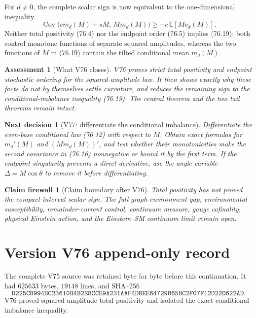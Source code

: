 \documentclass[11pt]{article}
\newtheorem{firewall}[theorem]{Claim firewall}
\newtheorem{decision}[theorem]{Next decision}
\newtheorem{assessment}[theorem]{Assessment}
\theoremstyle{remark}
\begin{document}
For \(d\neq0\), the complete scalar sign is now equivalent to the
one-dimensional inequality
\[
\boxed{
 \operatorname{Cov}
 \bigl(cm_d(M)+sM,\,Mm_d(M)\bigr)
 \geq-c\,\mathbb E[Mv_d(M)].}                    \tag{76.19}
\]
Neither total positivity (76.4) nor the endpoint order (76.5) implies
(76.19): both control monotone functions of separate squared
amplitudes, whereas the two functions of \(M\) in (76.19) contain the
tilted conditional mean \(m_d(M)\).

\begin{assessment}[What V76 closes]
\label{ass:v17v76-status}
V76 proves strict total positivity and endpoint stochastic ordering
for the squared-amplitude law.  It then shows exactly why these facts
do not by themselves settle curvature, and reduces the remaining sign
to the conditional-imbalance inequality (76.19).  The central theorem
and the two tail theorems remain intact.
\end{assessment}

\begin{decision}[V77: differentiate the conditional imbalance]
\label{dec:v17v76-next}
Differentiate the even-base conditional law (76.12) with respect to
\(M\).  Obtain exact formulas for \(m_d'(M)\) and
\((Mm_d(M))'\), and test whether their monotonicities make the second
covariance in (76.16) nonnegative or bound it by the first term.  If
the endpoint singularity prevents a direct derivative, use the angle
variable \(\Delta=M\cos\theta\) to remove it before differentiating.
\end{decision}

\begin{firewall}[Claim boundary after V76]
\label{fire:v17v76}
Total positivity has not proved the compact-interval scalar sign.
The full-graph environment gap, environmental susceptibility,
remainder-current control, continuum measure, gauge cofinality,
physical Einstein action, and the Einstein--SM continuum limit remain
open.
\end{firewall}

\section*{Version V76 append-only record}
The complete V75 source was retained byte for byte before this
continuation.  It had \(625633\) bytes, \(19148\) lines, and SHA--256
\[
 \texttt{D225C8994BC23610B4B2E8CCE9A231AAF4D8EE64729865BC2F07F12D22D622AD}.
\]
V76 proved squared-amplitude total positivity and isolated the exact
conditional-imbalance inequality.
\end{document}

